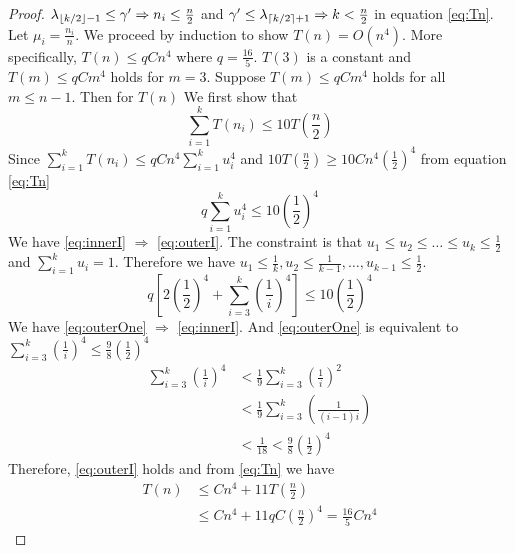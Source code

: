 \documentclass[runningheads]{llncs}
\begin{document}
\begin{proof}
	$\lambda_{\lfloor k/2\rfloor - 1} \leq \gamma' \Rightarrow n_i \leq \frac{n}{2}$ and $ \gamma' \leq \lambda_{\lceil k/2\rceil + 1} \Rightarrow k < \frac{n}{2} $ in equation \eqref{eq:Tn}. Let $\mu_i = \frac{n_i}{n}$. We proceed by induction to show $T(n) = O(n^4)$. More specifically, $T(n) \leq q C n^4$ where $ q = \frac{16}{5}$. $T(3)$ is a constant and $T(m) \leq q C m^4$ holds for $m=3$. Suppose
	$T(m) \leq qC m^4$ holds for all $m \leq n-1$. Then for $T(n)$
	We first show that 
	\begin{equation}\label{eq:outerI}
	\sum_{i=1}^k T(n_i) \leq 10 T(\frac{n}{2})
	\end{equation}
	Since $\sum_{i=1}^k T(n_i) \leq qC n^4\sum_{i=1}^k u_i^4$ and $10 T(\frac{n}{2}) \geq 10Cn^4 (\frac{1}{2})^4$ from equation \eqref{eq:Tn}
	\begin{equation}\label{eq:innerI}
       q\sum_{i=1}^k u_i^4 \leq 10 (\frac{1}{2})^4 
	\end{equation}
	We have \eqref{eq:innerI} $\Rightarrow$ \eqref{eq:outerI}. The constraint is that $u_1\leq u_2 \leq \dots \leq u_k \leq \frac{1}{2}$ and $\sum_{i=1}^k u_i = 1$. Therefore we have $u_1 \leq \frac{1}{k}, u_2 \leq \frac{1}{k-1}, \dots, u_{k-1} \leq \frac{1}{2}$.
	\begin{equation}\label{eq:outerOne}
	 q[2(\frac{1}{2})^4 + \sum_{i=3}^k (\frac{1}{i})^4] \leq 10 (\frac{1}{2})^4
	\end{equation}
	We have \eqref{eq:outerOne} $\Rightarrow$ \eqref{eq:innerI}. And \eqref{eq:outerOne} is equivalent to
	$\sum_{i=3}^k (\frac{1}{i})^4 \leq \frac{9}{8}(\frac{1}{2})^4$
	\begin{align*}
		\sum_{i=3}^k (\frac{1}{i})^4 & < \frac{1}{9}\sum_{i=3}^k (\frac{1}{i})^2 \\
		& < \frac{1}{9}\sum_{i=3}^k (\frac{1}{(i-1)i}) \\
		& < \frac{1}{18} < \frac{9}{8}(\frac{1}{2})^4
	\end{align*}
	Therefore, \eqref{eq:outerI} holds and from \eqref{eq:Tn} we have 
	\begin{align}
		T(n)  & \leq Cn^4 + 11T(\frac{n}{2}) \\
		& \leq C n^4 + 11 q C (\frac{n}{2})^4 = \frac{16}{5} C n^4
	\end{align}
\end{proof}	
\end{document}
